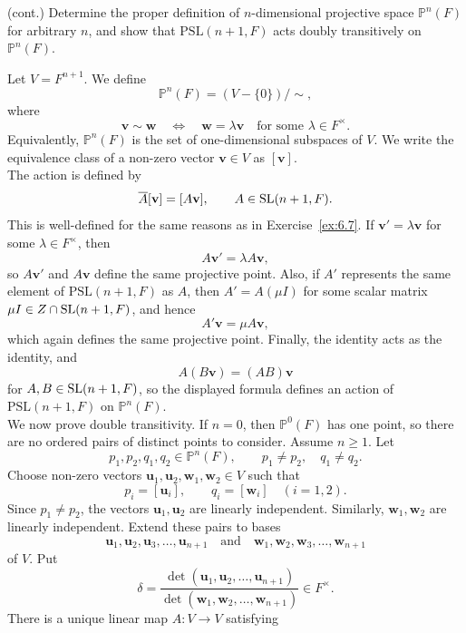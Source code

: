 \documentclass[../Odyssey_Project.tex]{subfiles}
\begin{document}
\begin{exercise}
\label{ex:6.8}
(cont.) Determine the proper definition of $n$-dimensional projective space $\mathbb{P}^n(F)$ for arbitrary $n$, and show that $\mathrm{PSL}(n+1,F)$ acts doubly transitively on $\mathbb{P}^n(F)$.
\end{exercise}
\begin{solution}
Let $V=F^{n+1}$. We define
\[
    \mathbb P^n(F)=(V-\{0\})/\sim,
\]
where
\[
    \mathbf v\sim \mathbf w
    \quad\Longleftrightarrow\quad
    \mathbf w=\lambda\mathbf v
    \quad\text{for some }\lambda\in F^\times.
\]
Equivalently, $\mathbb P^n(F)$ is the set of one-dimensional subspaces of $V$. We write the equivalence class of a non-zero vector $\mathbf v\in V$ as $[\mathbf v]$.\\
The action is defined by
\[
    \overline A[\mathbf v]=[A\mathbf v],
    \qquad
    A\in\operatorname{SL}(n+1,F).
\]
This is well-defined for the same reasons as in Exercise~\ref{ex:6.7}. If $\mathbf v'=\lambda\mathbf v$ for some $\lambda\in F^\times$, then
\[
    A\mathbf v'=\lambda A\mathbf v,
\]
so $A\mathbf v'$ and $A\mathbf v$ define the same projective point. Also, if $A'$ represents the same element of $\mathrm{PSL}(n+1,F)$ as $A$, then $A'=A(\mu I)$ for some scalar matrix $\mu I\in Z\cap\operatorname{SL}(n+1,F)$, and hence
\[
    A'\mathbf v=\mu A\mathbf v,
\]
which again defines the same projective point. Finally, the identity acts as the identity, and
\[
    A(B\mathbf v)=(AB)\mathbf v
\]
for $A,B\in\operatorname{SL}(n+1,F)$, so the displayed formula defines an action of $\mathrm{PSL}(n+1,F)$ on $\mathbb P^n(F)$.\\
We now prove double transitivity. If $n=0$, then $\mathbb P^0(F)$ has one point, so there are no ordered pairs of distinct points to consider. Assume $n\geq1$. Let
\[
    p_1,p_2,q_1,q_2\in\mathbb P^n(F),
    \qquad
    p_1\neq p_2,\quad q_1\neq q_2.
\]
Choose non-zero vectors $\mathbf u_1,\mathbf u_2,\mathbf w_1,\mathbf w_2\in V$ such that
\[
    p_i=[\mathbf u_i],
    \qquad
    q_i=[\mathbf w_i]
    \quad(i=1,2).
\]
Since $p_1\neq p_2$, the vectors $\mathbf u_1,\mathbf u_2$ are linearly independent. Similarly, $\mathbf w_1,\mathbf w_2$ are linearly independent. Extend these pairs to bases
\[
    \mathbf u_1,\mathbf u_2,\mathbf u_3,\ldots,\mathbf u_{n+1}
    \quad\text{and}\quad
    \mathbf w_1,\mathbf w_2,\mathbf w_3,\ldots,\mathbf w_{n+1}
\]
of $V$. Put
\[
    \delta=
    \frac{\det(\mathbf u_1,\mathbf u_2,\ldots,\mathbf u_{n+1})}
         {\det(\mathbf w_1,\mathbf w_2,\ldots,\mathbf w_{n+1})}
    \in F^\times.
\]
There is a unique linear map $A\colon V\to V$ satisfying

\end{solution}
\end{document}
